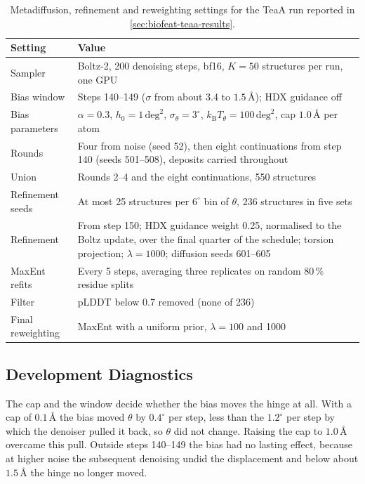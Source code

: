 \begin{table}[htbp]
    \centering
    \small
    \begin{tabularx}{\textwidth}{@{}l>{\raggedright\arraybackslash}X@{}}
    \toprule
        \textbf{Setting} & \textbf{Value} \\
    \midrule
        Sampler & Boltz-2, 200 denoising steps, bf16, $K=50$ structures per run, one GPU %
        \\
        Bias window & Steps 140--149 ($\sigma$ from about 3.4 to $1.5\,\text{\AA}$); HDX guidance off \\
        Bias parameters & $\alpha=0.3$, $h_0=1\,\mathrm{deg}^2$, $\sigma_\theta=3^\circ$, $k_\mathrm{B}T_\theta=100\,\mathrm{deg}^2$, cap $1.0\,\text{\AA}$ per atom \\
        Rounds & Four from noise (seed 52), then eight continuations from step 140 (seeds 501--508), deposits carried throughout \\
        Union & Rounds 2--4 and the eight continuations, 550 structures \\
        Refinement seeds & At most 25 structures per $6^\circ$ bin of $\theta$, 236 structures in five sets \\
        Refinement & From step 150; HDX guidance weight 0.25, normalised to the Boltz update, over the final quarter of the schedule; torsion projection; $\lambda=1000$; diffusion seeds 601--605 \\
        MaxEnt refits & Every 5 steps, averaging three replicates on random 80\,\% residue splits \\
        Filter & pLDDT below 0.7 removed (none of 236) \\
        Final reweighting & MaxEnt with a uniform prior, $\lambda=100$ and 1000 \\
    \bottomrule
    \end{tabularx}
    \caption{Metadiffusion, refinement and reweighting settings for the TeaA run reported in \cref{sec:biofeat-teaa-results}.}
    \label{tab:biofeat-metadiffusion}
\end{table}

\subsection{Development Diagnostics}
\label{app:biofeat-metadiffusion-diagnostics}

The cap and the window decide whether the bias moves the hinge at all. With a cap of $0.1\,\text{\AA}$ the bias moved $\theta$ by $0.4^\circ$ per step, less than the $1.2^\circ$ per step by which the denoiser pulled it back, so $\theta$ did not change. Raising the cap to $1.0\,\text{\AA}$ overcame this pull. Outside steps 140--149 the bias had no lasting effect, because at higher noise the subsequent denoising undid the displacement and below about $1.5\,\text{\AA}$ the hinge no longer moved.

